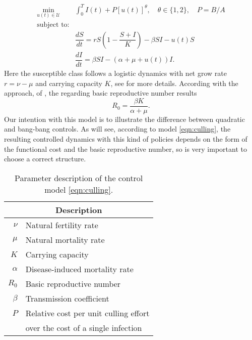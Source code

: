 \begin{equation}\label{eqn:culling}
	\begin{aligned}
  \min_{u(t)\in \mathcal{U}}
    &
    \int_0^T
      I(t) + P [u(t)]^{\theta}, \quad \theta \in \{1,2\},
      \quad P = B/A
  \\ \textrm{subject to:} &
  \\
    &\dfrac{dS}{dt} =
			r S 
			\left (
				1 - \dfrac{S+I}{K}
			\right)
			 - \beta SI - u(t) S
		\\
		&\dfrac{dI}{dt} =
			\beta SI - (\alpha + \mu + u(t)) I.
	\end{aligned}
\end{equation}
%
Here the susceptible class follows a logistic dynamics with net grow rate
$r = \nu - \mu$ and carrying capacity $K$, see 
for more details. According with the approach, 
of \citet{VandenDriessche2017}, the regarding basic reproductive number results
$$
  R_0 = \frac{\beta K}{\alpha + \mu}.
$$ 
  Our intention with this model is to illustrate the difference between
quadratic and bang-bang controls. As will see, according to model 
\eqref{eqn:culling}, the resulting controlled dynamics with this kind of 
policies depends on the form of the functional cost and the basic reproductive 
number, so is very important to choose a correct structure.
\begin{table}
  \begin{center}
    \begin{tabular}{@{}rl@{}}
        \toprule
      \multicolumn{2}{c}{\bf{Description}}
      \\
      \midrule
      $\nu$
        &
          Natural fertility rate
      \\
      $\mu$
        & Natural mortality rate
      \\
      $K$
        & Carrying capacity
      \\
      $\alpha$
        & Disease-induced mortality rate
      \\
      $R_0$
        & Basic reproductive number
      \\
      $\beta$
        & Transmission coefficient
      \\
      $P$
        & Relative cost per unit culling effort \\
        & over the cost of a single infection
      \\
      \bottomrule
    \end{tabular}
  \end{center}
  \caption{Parameter description of the control model \eqref{eqn:culling}.}
  \label{tbl:culling_parameter_des}
\end{table}